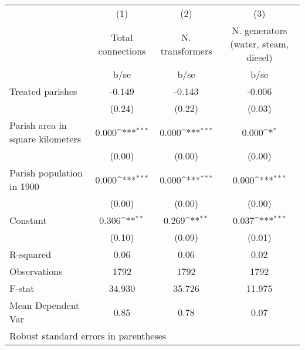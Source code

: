 {
\def\sym#1{\ifmmode^{#1}\else\(^{#1}\)\fi}
\begin{tabular}{l*{3}{c}}
\hline\hline
                    &\multicolumn{1}{c}{(1)}         &\multicolumn{1}{c}{(2)}         &\multicolumn{1}{c}{(3)}         \\
                    &Total connections         &N. transformers         &N. generators (water, steam, diesel)         \\
                    &        b/se         &        b/se         &        b/se         \\
\hline
Treated parishes    &      -0.149         &      -0.143         &      -0.006         \\
                    &      (0.24)         &      (0.22)         &      (0.03)         \\
Parish area in square kilometers&       0.000\sym{***}&       0.000\sym{***}&       0.000\sym{*}  \\
                    &      (0.00)         &      (0.00)         &      (0.00)         \\
Parish population in 1900&       0.000\sym{***}&       0.000\sym{***}&       0.000\sym{***}\\
                    &      (0.00)         &      (0.00)         &      (0.00)         \\
Constant            &       0.306\sym{**} &       0.269\sym{**} &       0.037\sym{***}\\
                    &      (0.10)         &      (0.09)         &      (0.01)         \\
\hline
R-squared           &        0.06         &        0.06         &        0.02         \\
Observations        &        1792         &        1792         &        1792         \\
F-stat              &      34.930         &      35.726         &      11.975         \\
Mean Dependent Var  &        0.85         &        0.78         &        0.07         \\
\hline\hline
\multicolumn{4}{l}{\footnotesize Robust standard errors in parentheses}\\
\end{tabular}
}
